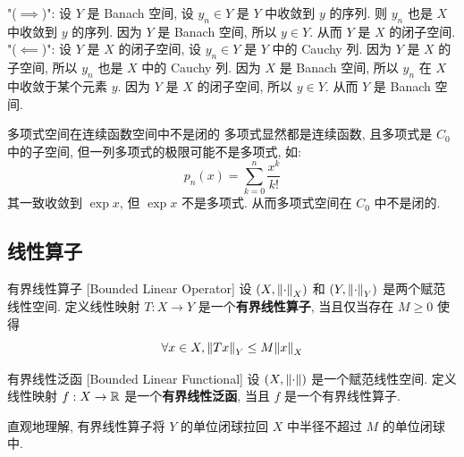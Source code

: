         \begin{prf}
            "(\(\implies\))": 设 \(Y\) 是 Banach 空间, 设 \(y_n\in Y\) 是 \(Y\) 中收敛到 \(y\) 的序列. 则 \(y_n\) 也是 \(X\) 中收敛到 \(y\) 的序列. 因为 \(Y\) 是 Banach 空间, 所以 \(y\in Y\). 从而 \(Y\) 是 \(X\) 的闭子空间. \\
            "(\(\impliedby\))": 设 \(Y\) 是 \(X\) 的闭子空间, 设 \(y_n\in Y\) 是 \(Y\) 中的 Cauchy 列. 因为 \(Y\) 是 \(X\) 的子空间, 所以 \(y_n\) 也是 \(X\) 中的 Cauchy 列. 因为 \(X\) 是 Banach 空间, 所以 \(y_n\) 在 \(X\) 中收敛于某个元素 \(y\). 因为 \(Y\) 是 \(X\) 的闭子空间, 所以 \(y\in Y\). 从而 \(Y\) 是 Banach 空间.
        \end{prf}

        \begin{cxmp}
            {多项式空间在连续函数空间中不是闭的}
            多项式显然都是连续函数, 且多项式是 \(C_0\) 中的子空间, 但一列多项式的极限可能不是多项式, 如:
            \[p_n(x)=\sum_{k=0}^n\frac{x^k}{k!}\]
            其一致收敛到 \(\exp x\), 但 \(\exp x\) 不是多项式. 从而多项式空间在 \(C_0\) 中不是闭的.
        \end{cxmp}

        \continued

    \subsection{线性算子}
    
        \begin{dfn}
            [blo]
            {有界线性算子}
            [Bounded Linear Operator]
            设 \((X, \norm{\cdot}_X)\) 和 \((Y, \norm{\cdot}_Y)\) 是两个赋范线性空间. 定义线性映射 \(T:X\to Y\) 是一个\textbf{有界线性算子}, 当且仅当存在 \(M\geq 0\) 使得
            \[\forall x\in X, \norm{Tx}_Y\leq M\norm{x}_X\]
        \end{dfn}

        \begin{dfn}
            [blf]
            {有界线性泛函}
            [Bounded Linear Functional]
            设 \((X, \norm{\cdot})\) 是一个赋范线性空间. 定义线性映射 \(f:X\to\operatorname{\mathbb{R}}\) 是一个\textbf{有界线性泛函}, 当且 \(f\) 是一个有界线性算子.
        \end{dfn}

        \begin{rmk}
            [Dedicatia]
            直观地理解, 有界线性算子将 \(Y\) 的单位闭球拉回 \(X\) 中半径不超过 \(M\) 的单位闭球中.
        \end{rmk}

